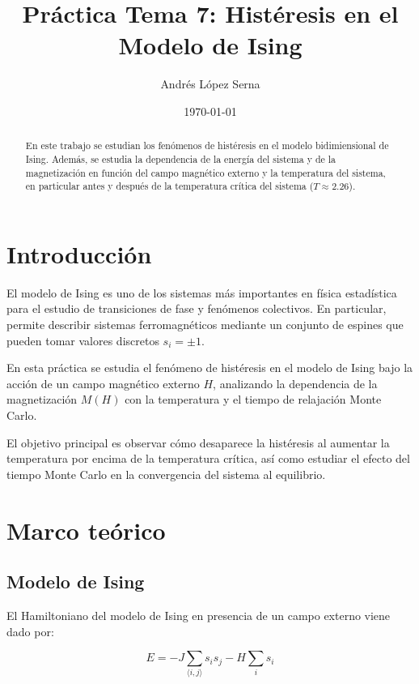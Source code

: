 \documentclass[12pt]{article}
\title{Práctica Tema 7: Histéresis en el Modelo de Ising}
\author{Andrés López Serna}
\date{\today}
\begin{document}
\maketitle

\begin{abstract}

En este trabajo se estudian los fenómenos de histéresis en el modelo bidimiensional de Ising. Además, se estudia la dependencia de la energía del sistema y de la magnetización en función del campo magnético externo y la temperatura del sistema, en particular antes y después de la temperatura crítica del sistema ($T \approx 2.26$).

\end{abstract}

\section{Introducción}

El modelo de Ising es uno de los sistemas más importantes en física estadística para el estudio de transiciones de fase y fenómenos colectivos. En particular, permite describir sistemas ferromagnéticos mediante un conjunto de espines que pueden tomar valores discretos $s_i = \pm 1$.

En esta práctica se estudia el fenómeno de histéresis en el modelo de Ising bajo la acción de un campo magnético externo $H$, analizando la dependencia de la magnetización $M(H)$ con la temperatura y el tiempo de relajación Monte Carlo.

El objetivo principal es observar cómo desaparece la histéresis al aumentar la temperatura por encima de la temperatura crítica, así como estudiar el efecto del tiempo Monte Carlo en la convergencia del sistema al equilibrio.

\section{Marco teórico}

\subsection{Modelo de Ising}

El Hamiltoniano del modelo de Ising en presencia de un campo externo viene dado por:

\begin{equation}
E = -J \sum_{\langle i,j \rangle} s_i s_j - H \sum_i s_i
\end{equation}
\end{document}
